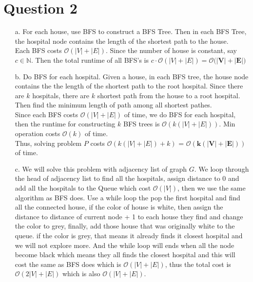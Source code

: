 \documentclass[10pt]{article}
\begin{document}
\newpage
\section*{Question 2}
\begin{itemize}
\item[a.]
For each house, use BFS to construct a BFS Tree. Then in each BFS Tree, the hospital node contains the length of the shortest path to the house. \\
Each BFS costs $\mathcal{O}(|V|+|E|)$. Since the number of house is constant, say $c\in\mathbb{N}$. Then the total runtime of all BFS's is $c\cdot\mathcal{O}(|V|+|E|)=\boldsymbol{\mathcal{O}(|V|+|E|})$
\item[b.]
Do BFS for each hospital. Given a house, in each BFS tree, the house node contains the the length of the shortest path to the root hospital. Since there are $k$ hospitals, there are $k$ shortest path from the house to a root hospital. Then find the minimum length of path among all shortest pathes.\\
Since each BFS costs $\mathcal{O}(|V|+|E|)$ of time, we do BFS for each hospital, then the runtime for constructing $k$ BFS trees is $\mathcal{O}(k(|V|+|E|))$. Min operation costs $\mathcal{O}(k)$ of time.\\
Thus, solving problem $P$ costs $\mathcal{O}(k(|V|+|E|)+k)$ = $\boldsymbol{\mathcal{O}(k(|V|+|E|))}$ of time.
\item[c.]
We will solve this problem with adjacency list of graph $G$. We loop through the head of adjacency list to find all the hospitals, assign distance to 0 and add all the hospitals to the Queue which cost $\mathcal{O}(|V|)$, then we use the same algorithm as BFS does. Use a while loop the pop the first hospital and find all the connected house, if the color of house is white, then assign the distance to distance of current node + 1 to each house they find and change the color to grey, finally, add those house that was originally white to the queue. if the color is grey, that means it already finds it closest hospital and we will not explore more. And the while loop will ends when all the node become black which means they all finds the closest hospital and this will cost the same as BFS does which is $\mathcal{O}(|V|+|E|)$, thus the total cost is $\mathcal{O}(2|V| + |E|)$ which is also $\mathcal{O}(|V| + |E|)$.

\end{itemize}
\end{document}

